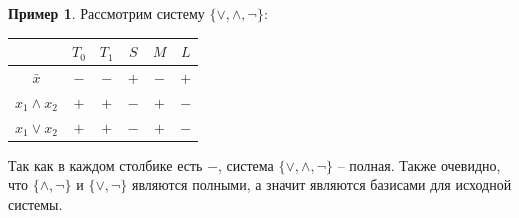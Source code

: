 \documentclass[a5paper, 11pt]{extarticle}
\theoremstyle{definition}
\newtheorem{example}{Пример}[subsection]
\theoremstyle{definition}
\theoremstyle{definition}
\numberwithin{figure}{section}
\numberwithin{table}{section}
\begin{document}
\begin{example}
    Рассмотрим систему \(\{\lor, \land, \neg\}\):
    {
    \renewcommand*{\arraystretch}{1.5}
    \begin{longtable}{|c|c|c|c|c|c|}
        \hline
                          & \(T_0\) & \(T_1\) & \(S\) & \(M\) & \(L\) \\
        \hline
        \(\bar{x}\)       & \(-\)   & \(-\)   & \(+\) & \(-\) & \(+\) \\
        \hline
        \(x_1 \land x_2\) & \(+\)   & \(+\)   & \(-\) & \(+\) & \(-\) \\
        \hline
        \(x_1 \lor x_2\)  & \(+\)   & \(+\)   & \(-\) & \(+\) & \(-\) \\
        \hline
    \end{longtable}
    }
    Так как в каждом столбике есть \(-\), система \(\{\lor, \land, \neg\}\) -- полная. Также очевидно, что \(\{\land, \neg\}\) и \(\{\lor, \neg\}\) являются полными, а значит являются базисами для исходной системы.
\end{example}
\end{document}
